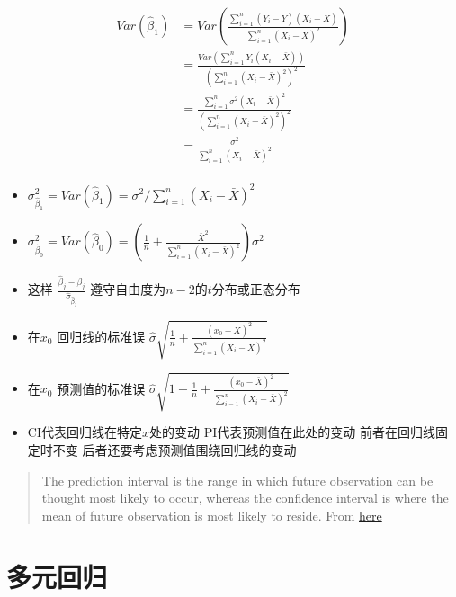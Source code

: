 \documentclass[]{book}
\providecommand{\tightlist}{%
  \setlength{\itemsep}{0pt}\setlength{\parskip}{0pt}}
\begin{document}
\begin{align}
Var(\hat \beta_1) & =
Var\left(\frac{\sum_{i=1}^n (Y_i - \bar Y) (X_i - \bar X)}{\sum_{i=1}^n (X_i - \bar X)^2}\right) \\
& = \frac{Var\left(\sum_{i=1}^n Y_i (X_i - \bar X) \right) }{\left(\sum_{i=1}^n (X_i - \bar X)^2 \right)^2} \\
& = \frac{\sum_{i=1}^n \sigma^2(X_i - \bar X)^2}{\left(\sum_{i=1}^n (X_i - \bar X)^2 \right)^2} \\
& = \frac{\sigma^2}{\sum_{i=1}^n (X_i - \bar X)^2} \\
\end{align}

\begin{itemize}
\tightlist
\item
  \(\sigma_{\hat \beta_1}^2 = Var(\hat \beta_1) = \sigma^2 / \sum_{i=1}^n (X_i - \bar X)^2\)
\item
  \(\sigma_{\hat \beta_0}^2 = Var(\hat \beta_0) = \left(\frac{1}{n} + \frac{\bar X^2}{\sum_{i=1}^n (X_i - \bar X)^2 }\right)\sigma^2\)
\item
  这样 \(\frac{\hat \beta_j - \beta_j}{\hat \sigma_{\hat \beta_j}}\) 遵守自由度为\(n-2\)的\(t\)分布或正态分布
\item
  在\(x_0\) 回归线的标准误 \(\hat \sigma\sqrt{\frac{1}{n} + \frac{(x_0 - \bar X)^2}{\sum_{i=1}^n (X_i - \bar X)^2}}\)
\item
  在\(x_0\) 预测值的标准误 \(\hat \sigma\sqrt{1 + \frac{1}{n} + \frac{(x_0 - \bar X)^2}{\sum_{i=1}^n (X_i - \bar X)^2}}\)
\item
  CI代表回归线在特定\(x\)处的变动 PI代表预测值在此处的变动 前者在回归线固定时不变 后者还要考虑预测值围绕回归线的变动
\end{itemize}

\begin{quote}
The prediction interval is the range in which future observation can be thought most likely to occur, whereas the confidence interval is where the mean of future observation is most likely to reside. From \href{http://stackoverflow.com/questions/9406139/r-programming-predict-prediction-vs-confidence/9406534\#9406534}{here}
\end{quote}

\section{多元回归}
\end{document}
